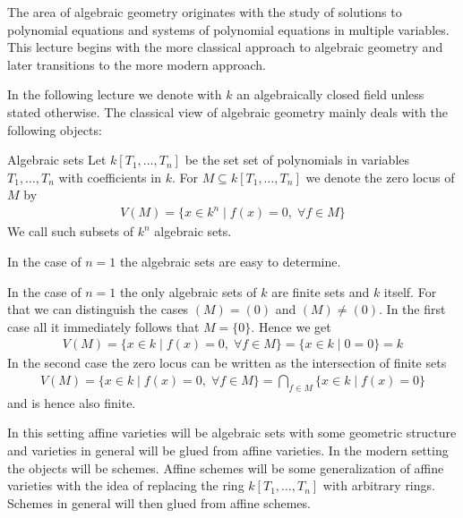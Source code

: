\documentclass[../notes.tex]{subfiles}
\begin{document}
The area of algebraic geometry originates with the study of solutions to polynomial equations
and systems of polynomial equations in multiple variables. This lecture begins with the more
classical approach to algebraic geometry and later transitions to the more modern approach.

\smallskip
\noindent
In the following lecture we denote with $k$ an algebraically closed field unless stated
otherwise. The classical view of algebraic geometry mainly deals with the following objects:

\smallskip

\begin{defi}{Algebraic sets}{}
  Let $k[T_1, \dots, T_n]$ be the set set of polynomials in variables $T_1, \dots, T_n$ with
  coefficients in $k$. For $M \subseteq k[T_1, \dots, T_n]$ we denote the zero locus
  of $M$ by
  \begin{align*}
    V(M) = \{x \in k^n \mid f(x) = 0 , \; \forall f \in M\}
  \end{align*}
  We call such subsets of $k^n$ algebraic sets.
\end{defi}

\smallskip
\noindent
In the case of $n = 1$ the algebraic sets are easy to determine.

\smallskip

\begin{ex}{}{}
  In the case of $n = 1$ the only algebraic sets of $k$ are finite sets and $k$ itself.
  For that we can distinguish the cases
  $(M) = (0)$ and $(M) \neq (0)$.
  In the first case all it immediately follows that $M = \{0\}$. Hence we get
  \begin{align*}
    V(M) = \{x \in k \mid f(x) = 0, \; \forall f \in M\} = \{x \in k \mid 0 = 0\}
    = k
  \end{align*}
  In the second case the zero locus can be written as the intersection of finite sets
  \begin{align*}
    V(M) = \{x \in k \mid f(x) = 0, \; \forall f \in M\} =
    \bigcap_{f \in M} \{x \in k \mid f(x) = 0 \} 
  \end{align*}
  and is hence also finite.
\end{ex}

\smallskip
\noindent
In this setting affine varieties will be algebraic sets with some geometric structure
and varieties in general will be glued from affine varieties. In the modern setting
the objects will be schemes. Affine schemes will be some generalization of affine varieties
with the idea of replacing the ring $k[T_1, \dots, T_n]$ with arbitrary rings.
Schemes in general will then glued from affine schemes.
\end{document}
